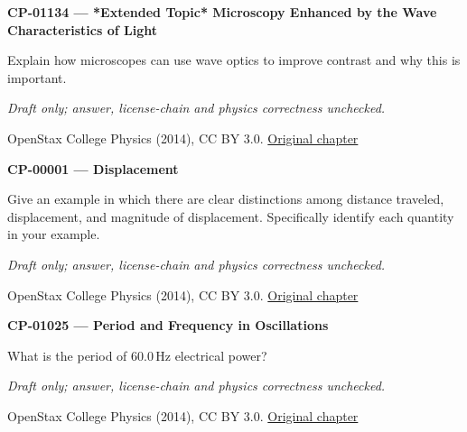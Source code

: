 
\par\medskip
\noindent\textbf{CP-01134 — *Extended Topic* Microscopy Enhanced by the Wave Characteristics of Light}
\par Explain how microscopes can use wave optics to improve contrast and why this is important.
\par\smallskip
\textit{Draft only; answer, license-chain and physics correctness unchecked.}
\par{\footnotesize OpenStax College Physics (2014), CC BY 3.0. \href{https://github.com/philschatz/physics-book/blob/a7efaa7e221fab1694022d8bb98b83a73ee31d3d/contents/m42290.md}{Original chapter}}\par\normalsize

\par\medskip
\noindent\textbf{CP-00001 — Displacement}
\par Give an example in which there are clear distinctions among distance traveled, displacement, and magnitude of displacement. Specifically identify each quantity in your example.
\par\smallskip
\textit{Draft only; answer, license-chain and physics correctness unchecked.}
\par{\footnotesize OpenStax College Physics (2014), CC BY 3.0. \href{https://github.com/philschatz/physics-book/blob/a7efaa7e221fab1694022d8bb98b83a73ee31d3d/contents/m42033.md}{Original chapter}}\par\normalsize

\par\medskip
\noindent\textbf{CP-01025 — Period and Frequency in Oscillations}
\par What is the period of $60.0\,\mathrm{Hz}$ electrical power?
\par\smallskip
\textit{Draft only; answer, license-chain and physics correctness unchecked.}
\par{\footnotesize OpenStax College Physics (2014), CC BY 3.0. \href{https://github.com/philschatz/physics-book/blob/a7efaa7e221fab1694022d8bb98b83a73ee31d3d/contents/m42241.md}{Original chapter}}\par\normalsize


